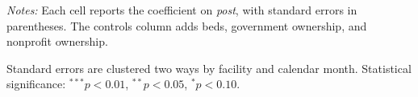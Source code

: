 \documentclass[12pt]{article}
\begin{document}
\begin{table}[H]
\begin{threeparttable}
\begin{tablenotes}[flushleft]
\footnotesize
\item \textit{Notes:} Each cell reports the coefficient on \textit{post}, with standard errors in parentheses. The controls column adds beds, government ownership, and nonprofit ownership.
\item Standard errors are clustered two ways by facility and calendar month. Statistical significance: $^{***}p<0.01$, $^{**}p<0.05$, $^{*}p<0.10$.
\end{tablenotes}
\end{threeparttable}
\end{table}
\end{document}
